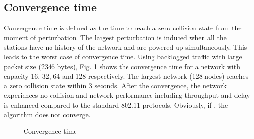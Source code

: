 \documentclass{acm_proc_article-sp}
\begin{document}
\subsection{Convergence time}
Convergence time is defined as the time to reach a zero collision state from the moment of perturbation. The largest perturbation
is induced when all the stations have no history of the network and are powered up simultaneously. This leads to the worst case
of convergence time. Using backlogged traffic with large packet size (2346 bytes), Fig. \ref{fig.convergencetime} shows the convergence
time for a network with capacity 16, 32, 64 and 128 respectively. The largest network (128 nodes) reaches a zero collision state
within 3 seconds. After the convergence, the network experiences no collision and network performance including throughput and delay is
enhanced compared to the standard 802.11 protocols. Obviously, if , the algorithm does not converge.
\begin{figure}[ht]
  \begin{center}
  \caption{Convergence time}\label{fig.convergencetime}
  \end{center}
\vspace{-0.2in}
\end{figure}
\end{document}
